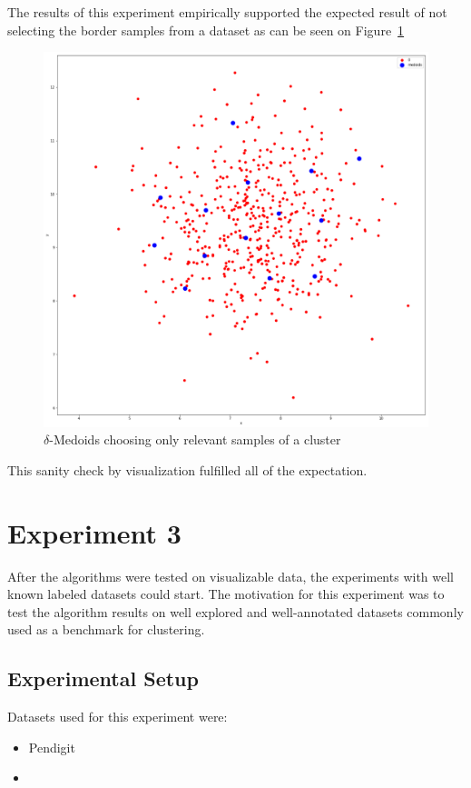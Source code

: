\documentclass[thesis=B,english]{FITthesis}[2012/10/20]
\begin{document}
The results of this experiment empirically supported the expected result of not selecting the border samples from a dataset as can be seen on Figure~\ref{img:blobs_good_select}
\begin{figure}
  \includegraphics[width=\linewidth]{img/delta_medoids_select_better.png}
  \caption{$\delta$-Medoids choosing only relevant samples of a cluster}
  \label{img:blobs_good_select}
\end{figure}
This sanity check by visualization fulfilled all of the expectation.

\section{Experiment 3}\label{sec:exp3}

After the algorithms were tested on visualizable data, the experiments with well known labeled datasets could start.
The motivation for this experiment was to test the algorithm results on well explored and well-annotated datasets commonly used as a benchmark for clustering.

\subsection{Experimental Setup}
Datasets used for this experiment were:
\begin{itemize}
    \item Pendigit
    \item
\end{itemize}
\end{document}
